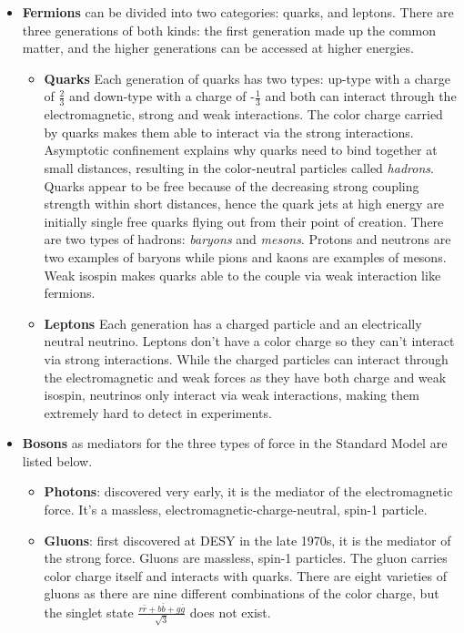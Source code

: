 \begin{itemize}
 \item \textbf{Fermions} can be divided into two categories: quarks, and leptons. There are three generations of both kinds: the first generation made up the common matter, and the higher generations can be accessed at higher energies.
\begin{itemize}
 \item \textbf{Quarks} Each generation of quarks has two types: up-type with a charge of $\frac{2}{3}$ and down-type with a charge of -$\frac{1}{3}$ and both
   can interact through the electromagnetic, strong and weak interactions. The color charge carried by quarks makes them able to interact via the strong interactions. Asymptotic confinement explains why quarks need to bind together at small distances, resulting in the color-neutral particles called \textit{hadrons}. Quarks appear to be free because of the decreasing strong coupling strength within short distances, hence the quark jets at high energy are initially single free quarks flying
out from their point of creation.
    There are two types of hadrons: \textit{baryons} and \textit{mesons}. Protons and neutrons are two examples of baryons while pions and kaons are examples of mesons. Weak isospin makes quarks able to the couple via weak interaction like fermions.
 \item \textbf{Leptons} Each generation has a charged particle and an electrically neutral neutrino. Leptons don't have a color charge so they can't interact via strong interactions. While the charged particles can interact through the electromagnetic and weak forces as they have both charge and weak isospin, neutrinos only interact via weak interactions, making them extremely hard to detect in experiments.
\end{itemize}
 \item \textbf{Bosons} as mediators for the three types of force in the Standard Model are listed below.
\begin{itemize}
 \item \textbf{Photons}: discovered very early, it is the mediator of the electromagnetic force. It's a massless, electromagnetic-charge-neutral, spin-1 particle.
 \item \textbf{Gluons}: first discovered at DESY in the late 1970s, it is the mediator of the strong force. 
   Gluons are massless, spin-1 particles. The gluon carries color charge itself and interacts with quarks. 
    There are eight varieties of gluons as there are nine different combinations of the color charge, but the singlet state $\frac{r\bar{r}+b\bar{b}+g\bar{g}}{\sqrt{3}}$ does not exist.



\end{itemize}
\end{itemize}

